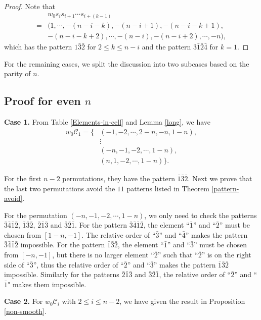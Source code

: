 \documentclass[11pt, reqno]{amsart}
\theoremstyle{definition}
\numberwithin{equation}{section}
\begin{document}
\begin{proof}
 Note that 
    \begin{align*}
        &w_0s_is_{i+1}\cdots s_{i+(k-1)}\\
        =&(1,\cdots,-(n-i-k),-(n-i+1),-(n-i-k+1),\\&-(n-i-k+2),\cdots,-(n-i),-(n-i+2),\cdots,-n),
    \end{align*}
which has the pattern $1\bar{3}\bar{2}$ for $2\leq k\leq n-i$ and the pattern $3\bar{1}\bar{2}\bar{4}$ for $k=1$.

\end{proof}


For the remaining cases, we split the discussion into two subcases based on the parity of \(n\).
\subsection{Proof for even $n$}

{\bf Case 1.} From Table \ref{Elements-in-cell} and Lemma \ref{long}, we have 
\begin{align*}
    w_0\mathcal{C}_1=\{&(-1,-2,\cdots,2-n,-n,1-n),\\
	&\vdots\\
    &(-n,-1,-2,\cdots,1-n),\\
	&(n,1,-2,\cdots,1-n)\}.
\end{align*}

For the first $n-2$ permutations, they have the pattern $\bar{1}\bar{3}\bar{2}$. Next we prove that the last two permutations avoid the  $11$ patterns listed in Theorem \ref{pattern-avoid}.

For the permutation $(-n,-1,-2,\cdots,1-n)$, we only need to check the patterns $\bar{3}\bar{4}\bar{1}\bar{2}$, $\bar{1}\bar{3}\bar{2}$, $\bar{2}\bar{1}\bar{3}$ and $\bar{3}\bar{2}\bar{1}$. For the pattern $\bar{3}\bar{4}\bar{1}\bar{2}$, the element “$\bar{1}$” and “$\bar{2}$”  
must be chosen from $[1-n,-1]$. The relative order of “$\bar{3}$” and “$\bar{4}$” makes the pattern $\bar{3}\bar{4}\bar{1}\bar{2}$  impossible. For the pattern $\bar{1}\bar{3}\bar{2}$, the element “$\bar{1}$” and “$\bar{3}$”  
must be chosen from $[-n,-1]$, but there is no larger element “$\bar{2}$” such that “$\bar{2}$” is on the right side of  “$\bar{3}$”, thus the relative order of “$\bar{2}$” and “$\bar{3}$” makes the pattern $\bar{1}\bar{3}\bar{2}$ impossible. Similarly for the patterns $\bar{2}\bar{1}\bar{3}$ and $\bar{3}\bar{2}\bar{1}$, the relative order of “$\bar{2}$” and “$\bar{1}$" makes them impossible.

{\bf Case 2.} For $ w_0\mathcal{C}_{i}$ with $2\leq i\leq n-2$, we have given the result in Proposition \ref{non-smooth}.
\end{document}
